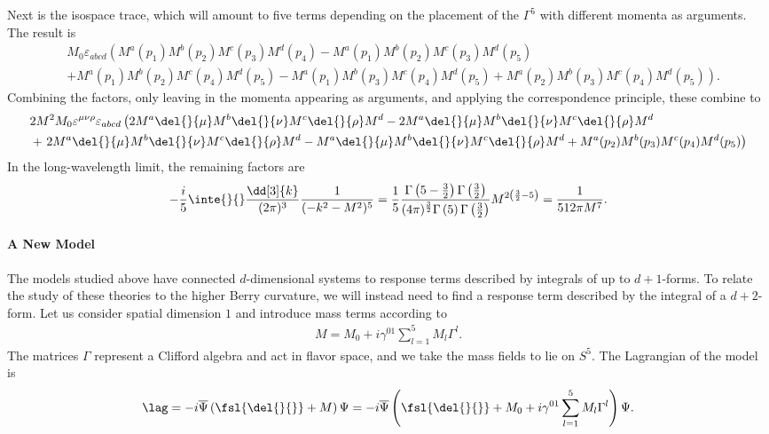 Next is the isospace trace, which will amount to five terms depending on the placement of the $\Gamma^{5}$ with different momenta as arguments. The result is
\begin{align*}
	&M_{0}\varepsilon_{abcd}\left(M^{a}(p_{1})M^{b}(p_{2})M^{c}(p_{3})M^{d}(p_{4}) - M^{a}(p_{1})M^{b}(p_{2})M^{c}(p_{3})M^{d}(p_{5}) \right. \\
	&+ M^{a}(p_{1})M^{b}(p_{2})M^{c}(p_{4})M^{d}(p_{5})- \left. M^{a}(p_{1})M^{b}(p_{3})M^{c}(p_{4})M^{d}(p_{5}) + M^{a}(p_{2})M^{b}(p_{3})M^{c}(p_{4})M^{d}(p_{5})\right).
\end{align*}
Combining the factors, only leaving in the momenta appearing as arguments, and applying the correspondence principle, these combine to
\begin{align*}
	&2M^{2}M_{0}\varepsilon^{\mu\nu\rho}\varepsilon_{abcd}\left(2M^{a}\del{}{\mu}M^{b}\del{}{\nu}M^{c}\del{}{\rho}M^{d} - 2M^{a}\del{}{\mu}M^{b}\del{}{\nu}M^{c}\del{}{\rho}M^{d} \right. \\
	&+ \left. 2M^{a}\del{}{\mu}M^{b}\del{}{\nu}M^{c}\del{}{\rho}M^{d} - M^{a}\del{}{\mu}M^{b}\del{}{\nu}M^{c}\del{}{\rho}M^{d} + M^{a}(p_{2})M^{b}(p_{3})M^{c}(p_{4})M^{d}(p_{5})\right)
\end{align*}
In the long-wavelength limit, the remaining factors are
\begin{align*}
	-\frac{i}{5}\inte{}{}\frac{\dd[3]{k}}{(2\pi)^{3}}\frac{1}{(-k^{2} - M^{2})^{5}} = \frac{1}{5}\frac{\Gamma\left(5 - \frac{3}{2}\right)\Gamma\left(\frac{3}{2}\right)}{(4\pi)^{\frac{3}{2}}\Gamma\left(5\right)\Gamma\left(\frac{3}{2}\right)}M^{2\left(\frac{3}{2} - 5\right)} = \frac{1}{512\pi M^{7}}.
\end{align*}

\paragraph{A New Model}
The models studied above have connected $d$-dimensional systems to response terms described by integrals of up to $d + 1$-forms. To relate the study of these theories to the higher Berry curvature, we will instead need to find a response term described by the integral of a $d + 2$-form. Let us consider spatial dimension $1$ and introduce mass terms according to
\begin{align*}
	M = M_{0} + i\gamma^{01}\sum\limits_{l = 1}^{5}M_{l}\Gamma^{l}.
\end{align*}
The matrices $\Gamma$ represent a Clifford algebra and act in flavor space, and we take the mass fields to lie on $S^{5}$. The Lagrangian of the model is
\begin{align*}
	\lag = -i\overline{\Psi}\left(\fsl{\del{}{}} + M\right)\Psi = -i\overline{\Psi}\left(\fsl{\del{}{}} + M_{0} + i\gamma^{01}\sum\limits_{l = 1}^{5}M_{l}\Gamma^{l}\right)\Psi.
\end{align*}

